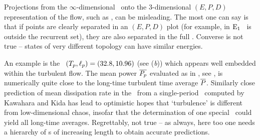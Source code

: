 Projections from the $\infty$-dimensional \statesp\ onto the 3-dimensional
$(E,P,D)$ representation of the flow, such as
, can be misleading.
The most one can say is that if points are clearly separated in an
$(E,P,D)$ plot (for example, in 
$\mathrm{E}_{1}$ \eqv\ is outside the recurrent set), they are also separated
in the full \statesp.  Converse is not true -- states of
very different topology can have similar energies.

An example is
the \rpo\ $({T_{p}},\ell_p) = (32.8,10.96)$ 
(see (\textit{b})) which appears well embedded
within the turbulent flow. The mean power $\overline{P_p}$ evaluated
as in , see ,
is numerically quite close to the long-time
turbulent time average $\overline{P}$.
Similarly close prediction of mean dissipation rate in the
\pCf\ from a single-period \po\ computed by
Kawahara and Kida has lead to
optimistic hopes that `turbulence' is different from
low-dimensional chaos, insofar that the determination of one special
\po\ could yield all long-time averages.
Regrettably, not true -- as always, here too one needs a hierarchy
of \po s of increasing length to obtain accurate
predictions.



